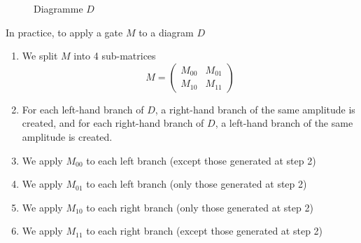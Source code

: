 \begin{figure}[ht]
  \centering
\caption{Diagramme $D$}
\label{fig:D_avant_porte}
\end{figure}

In practice, to apply a gate $M$ to a diagram $D$
\begin{enumerate}
  \item We split $M$ into 4 sub-matrices
  $$M = \begin{pmatrix}
    M_{00} & M_{01} \\
    M_{10} & M_{11}
  \end{pmatrix}$$
  \item For each left-hand branch of $D$, a right-hand branch of the same amplitude is created, and for each right-hand branch of $D$, a left-hand branch of the same amplitude is created.
  \item We apply $M_{00}$ to each left branch (except those generated at step 2)
  \item We apply $M_{01}$ to each left branch (only those generated at step 2)
  \item We apply $M_{10}$ to each right branch (only those generated at step 2)
  \item We apply $M_{11}$ to each right branch (except those generated at step 2)
\end{enumerate}

